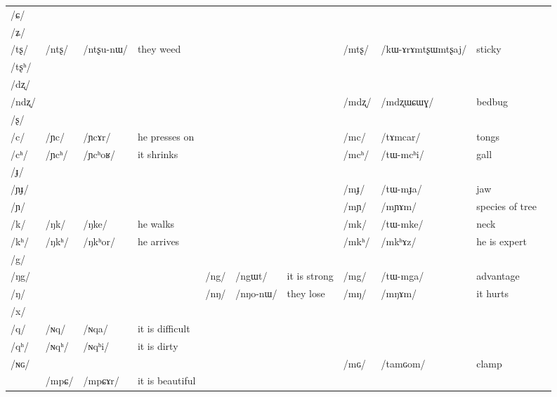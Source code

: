 \documentclass[oneside,a4paper,11pt]{article}
\newcommand{\ipa}[1]{\mbox{\phon/#1/}}
\newcommand{\deux}[1]{\ipa{#1}\addtocounter{2clusters}{1}}
\newcommand{\trois}[1]{\ipa{#1}\addtocounter{3clusters}{1}}
\begin{document}
\begin{landscape}
\begin{table}
\end{table}
 \begin{table}
\begin{tabular}{l|lll|lll|lll|l}
\toprule
\ipa{ɕ} 	& 	& 	& 	& 	& 	& 	& 	& 	&  \\
\ipa{ʑ} 	& 	& 	& 	& 	& 	& 	& 	& 	&  \\
\ipa{tʂ} 	& \deux{ntʂ} 	& \ipa{ntʂu-nɯ} 	& they weed 	& 	& 	& 	& \deux{mtʂ} 	& \ipa{kɯ-ɤrɤmtʂɯmtʂaj} 	& sticky \\
\ipa{tʂʰ} 	& 	& 	& 	& 	& 	& 	& 	& 	&  \\
\ipa{dʐ} 	& 	& 	& 	& 	& 	& 	& 	& 	&  \\
\ipa{ndʐ} 	& 	& 	& 	& 	& 	& 	& \deux{mdʐ} 	& \ipa{mdʐɯɕɯɣ} 	& bedbug \\
\ipa{ʂ} 	& 	& 	& 	& 	& 	& 	& 	& 	&  \\
\ipa{c} 	& \deux{ɲc} 	& \ipa{ɲcɤr} 	& he presses on	& 	& 	& 	& \deux{mc} 	& \ipa{tɤmcar} 	& tongs \\
\ipa{cʰ} 	& \deux{ɲcʰ} 	& \ipa{ɲcʰoʁ} 	& it shrinks	& 	& 	& 	& \deux{mcʰ} 	& \ipa{tɯ-mcʰi} 	& gall \\
\ipa{ɟ} 	& 	& 	& 	& 	& 	& 	& 	& 	&  \\
\ipa{ɲɟ} 	& 	& 	& 	& 	& 	& 	& \deux{mɟ} 	& \ipa{tɯ-mɟa} 	& jaw \\
\ipa{ɲ} 	& 	& 	& 	& 	& 	& 	& \deux{mɲ} 	& \ipa{mɲɤm} 	& species of tree \\
\ipa{k} 	& \deux{ŋk} 	& \ipa{ŋke} 	& he walks	& 	& 	& 	& \deux{mk} 	& \ipa{tɯ-mke} 	& neck \\
\ipa{kʰ} 	& \deux{ŋkʰ} 	& \ipa{ŋkʰor} 	&he arrives 	& 	& 	& 	& \deux{mkʰ} 	& \ipa{mkʰɤz} 	&he is expert  \\
\ipa{g} 	& 	& 	& 	& 	& 	& 	& 	& 	&  \\
\ipa{ŋg} 	& 	& 	& 	& \deux{ng} 	& \ipa{ngɯt} 	&it is strong 	& \deux{mg} 	& \ipa{tɯ-mga} 	& advantage \\
\ipa{ŋ} 	& 	& 	& 	& \deux{nŋ} 	& \ipa{nŋo-nɯ} 	& they lose	& \deux{mŋ} 	& \ipa{mŋɤm} 	& it hurts \\
\ipa{x} 	& 	& 	& 	& 	& 	& 	& 	& 	&  \\
\ipa{q} 	&   \deux{ɴq} 	& \ipa{ɴqa} 	& it is difficult	& 	&  	&	&	&	&\\
\ipa{qʰ}   	&   \deux{ɴqʰ} 	& \ipa{ɴqʰi} 	& it is dirty	& 	&	& 	& 	& 	&\\
\ipa{ɴɢ}  	& 	&	&	& 	& 	& 	& \deux{mɢ} 	& \ipa{tamɢom} 	&clamp  \\
\midrule
&\trois{mpɕ} &\ipa{mpɕɤr} & it is beautiful\\
\bottomrule
\end{tabular}%
\end{table}
\end{landscape}
\end{document}
